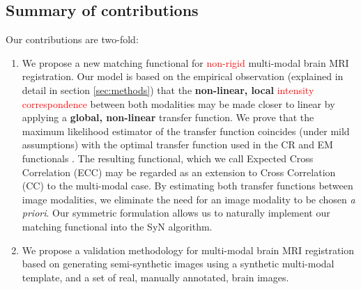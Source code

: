 \subsection{Summary of contributions}
Our contributions are two-fold:
\begin{enumerate}
\item{We propose a new matching functional for \textcolor{red}{non-rigid} multi-modal brain MRI registration. Our model is based on the empirical observation (explained in detail in section \ref{sec:methods}) that the \textbf{non-linear, local} \textcolor{red}{intensity correspondence} between both modalities may be made closer to linear by applying a \textbf{global, non-linear} transfer function. We prove that the maximum likelihood estimator of the transfer function coincides (under mild assumptions) with the optimal transfer function used in the CR and EM functionals \cite{Roche1998} \cite{Arce-santana2014} \cite{Ocegueda2015}. The resulting functional, which we call Expected Cross Correlation (ECC) may be regarded as an extension to Cross Correlation (CC) to the multi-modal case. By estimating both transfer functions between image modalities, we eliminate the need for an image modality to be chosen {\it a priori}. Our symmetric formulation allows us to naturally implement our matching functional into the SyN \cite{Avants2011a} algorithm.}
\item{We propose a validation methodology for multi-modal brain MRI registration based on generating semi-synthetic images using a synthetic multi-modal template, and a set of real, manually annotated, brain images.}
\end{enumerate}
